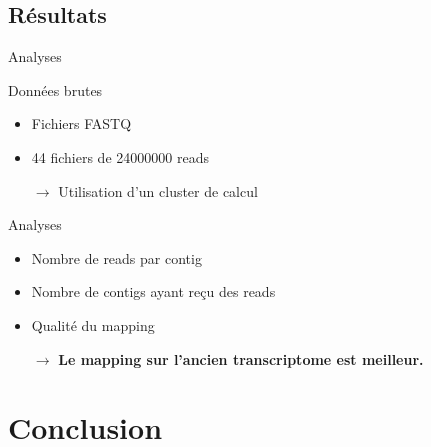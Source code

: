 \subsection{Résultats}
\begin{frame}{Analyses}
    \begin{block}{Données brutes}
            \begin{itemize}
                \item Fichiers FASTQ
                \item 44 fichiers de \num{24 000 000} reads
                \item[$\rightarrow$] Utilisation d'un cluster de calcul
           \end{itemize}
    \end{block}

    \begin{block}{Analyses}
        \begin{itemize}
            \item Nombre de reads par contig
            \item Nombre de contigs ayant reçu des reads
            \item Qualité du mapping
        \end{itemize}
    \end{block}

    \pause
    \begin{itemize}
        \item[$\rightarrow$] \textbf{Le mapping sur l'ancien transcriptome est meilleur.}
    \end{itemize}





\end{frame}

%
%

\section{Conclusion}

